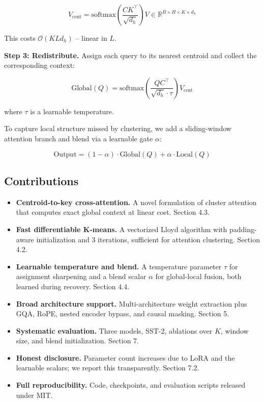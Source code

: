 \begin{equation}
V_{\text{cent}} = \text{softmax}\!\left(\frac{C K^\top}{\sqrt{d_h}}\right) V \in \mathbb{R}^{B \times H \times K \times d_h}
\end{equation}

This costs $\mathcal{O}(K L d_h)$ -- linear in $L$.

\textbf{Step 3: Redistribute.} Assign each query to its nearest centroid and 
collect the corresponding context:

\begin{equation}
\text{Global}(Q) = \text{softmax}\!\left(\frac{Q C^\top}{\sqrt{d_h} \cdot \tau}\right) V_{\text{cent}}
\end{equation}

where $\tau$ is a learnable temperature.

To capture local structure missed by clustering, we add a sliding-window 
attention branch and blend via a learnable gate $\alpha$:

\begin{equation}
\text{Output} = (1 - \alpha) \cdot \text{Global}(Q) + \alpha \cdot \text{Local}(Q)
\end{equation}

\subsection{Contributions}

\begin{itemize}
\item \textbf{Centroid-to-key cross-attention.} A novel formulation of cluster
  attention that computes exact global context at linear cost. Section 4.3.
\item \textbf{Fast differentiable K-means.} A vectorized Lloyd algorithm with
  padding-aware initialization and 3 iterations, sufficient for attention
  clustering. Section 4.2.
\item \textbf{Learnable temperature and blend.} A temperature parameter $\tau$ for
  assignment sharpening and a blend scalar $\alpha$ for global-local fusion,
  both learned during recovery. Section 4.4.
\item \textbf{Broad architecture support.} Multi-architecture weight extraction plus
  GQA, RoPE, nested encoder bypass, and causal masking. Section 5.
\item \textbf{Systematic evaluation.} Three models, SST-2, ablations over $K$,
  window size, and blend initialization. Section 7.
\item \textbf{Honest disclosure.} Parameter count increases due to LoRA and the
  learnable scalars; we report this transparently. Section 7.2.
\item \textbf{Full reproducibility.} Code, checkpoints, and evaluation scripts
  released under MIT.

\end{itemize}
